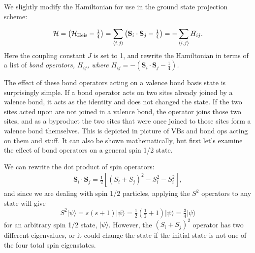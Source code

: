 We slightly modify the Hamiltonian for use in the ground state projection scheme:

\begin{equation}
\mathcal{H}= \left(\mathcal{H}_{\rm{Heis}} - \tfrac{1}{4} \right)= \sum_{\langle i,j \rangle} 
	\left(\mathbf{S}_i\cdot \mathbf{S}_j - \tfrac{1}{4}\right)
	= - \sum_{\langle i,j \rangle} H_{ij}.
\end{equation}
Here the coupling constant $J$ is set to 1, and rewrite the Hamiltonian in terms of a list of
\it{bond operators}, \rm $H_{ij}$, where 
$H_{ij}=-\left(\mathbf{S}_i\cdot \mathbf{S}_j - \tfrac{1}{4}\right)$.

The effect of these bond operators acting on a valence bond basis state is 
surprisingly simple.  If a bond operator acts on two sites already joined by a valence
bond, it acts as the identity and does not changed the state.  If the two sites acted upon are 
not joined in a valence bond, the operator joins those two sites, and as a byproduct the 
two sites that were once joined to those sites form a valence bond themselves.
This is depicted in {\color{red} picture of VBs and bond ops acting on them and stuff.}
It can also be shown mathematically, but first let's examine the effect of bond operators
on a general spin 1/2 state.

We can rewrite the dot product of spin operators:
\begin{eqnarray}
\mathbf{S}_i\cdot \mathbf{S}_j = \tfrac{1}{2}\left[ \left(S_i + S_j\right)^2 -S_i^2-S_i^2 \right],
\end{eqnarray}
and since we are dealing with spin 1/2 particles, applying the $S^2$ operators to any state will
give 
\begin{equation}
S^2\lvert \psi\rangle = s(s+1)\lvert \psi \rangle = \tfrac{1}{2}(\tfrac{1}{2} + 1)\lvert \psi \rangle
	= \tfrac{3}{4}\lvert\psi\rangle
\end{equation}
for an arbitrary spin 1/2 state, $\lvert \psi\rangle$.  However, the $\left(S_i + S_j\right)^2$ 
operator has two different eigenvalues, or it could change the state
if the initial state is not one of the four total spin eigenstates.

